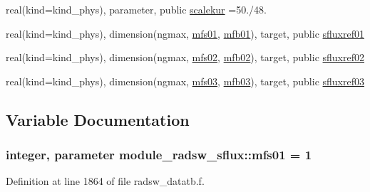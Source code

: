 \begin{DoxyCompactItemize}
real(kind=kind\+\_\+phys), parameter, public \hyperlink{group__module__radsw__main_ga2f3280a36f27cea89fc66d71e799cf6d}{scalekur} =50./48.
\item 
real(kind=kind\+\_\+phys), dimension(ngmax, \hyperlink{namespacemodule__radsw__sflux_aba08e6f9d4dccd130e87300e6fd0ed58}{mfs01}, \hyperlink{group__module__radsw__main_ga08a0f1278962ac27634169ea7632bc70}{mfb01}), target, public \hyperlink{group__module__radsw__main_ga84205f359fb3e1a0e1d03e755c52dc78}{sfluxref01}
\item 
real(kind=kind\+\_\+phys), dimension(ngmax, \hyperlink{group__module__radsw__main_gacca3bbc0dd125a3e8c3734c58c48e79b}{mfs02}, \hyperlink{group__module__radsw__main_gafdf71cabed6ae0076d98ff0e563dbc61}{mfb02}), target, public \hyperlink{group__module__radsw__main_gaa57fca862289bd57327b9c3ef27e3e2f}{sfluxref02}
\item 
real(kind=kind\+\_\+phys), dimension(ngmax, \hyperlink{group__module__radsw__main_ga5bd55a5106ce82bd47250d38d9b8f22a}{mfs03}, \hyperlink{group__module__radsw__main_ga2e3b510d781c596fa0bb9b1359a988dd}{mfb03}), target, public \hyperlink{group__module__radsw__main_ga95d2640cf0e6cf0ba4a8ca1758806e48}{sfluxref03}
\end{DoxyCompactItemize}


\subsection{Variable Documentation}
\subsubsection[{\texorpdfstring{mfs01}{mfs01}}]{\setlength{\rightskip}{0pt plus 5cm}integer, parameter module\+\_\+radsw\+\_\+sflux\+::mfs01 = 1}\hypertarget{namespacemodule__radsw__sflux_aba08e6f9d4dccd130e87300e6fd0ed58}{}\label{namespacemodule__radsw__sflux_aba08e6f9d4dccd130e87300e6fd0ed58}


Definition at line 1864 of file radsw\+\_\+datatb.\+f.

